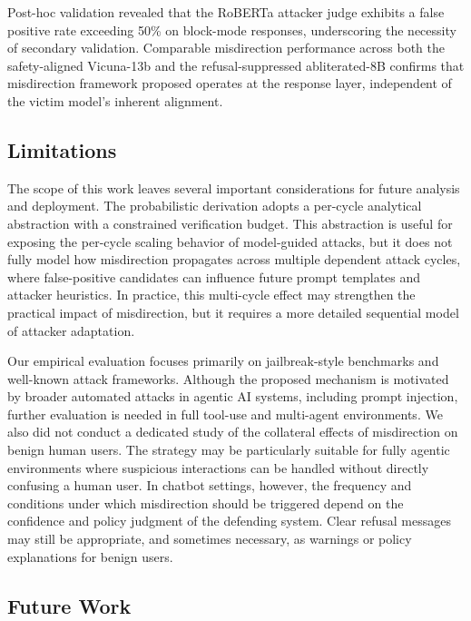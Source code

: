 \documentclass[conference,compsoc]{IEEEtran}
\begin{document}
Post-hoc validation revealed that the RoBERTa attacker judge exhibits a false positive rate exceeding 50\% on block-mode responses, underscoring the necessity of secondary validation. Comparable misdirection performance across both the safety-aligned Vicuna-13b and the refusal-suppressed abliterated-8B confirms that misdirection framework proposed operates at the response layer, independent of the victim model's inherent alignment.


\subsection{Limitations}
\label{sec:limitations}

The scope of this work leaves several important considerations for future analysis and deployment.
The probabilistic derivation adopts a per-cycle analytical abstraction with a constrained verification budget.
This abstraction is useful for exposing the per-cycle scaling behavior of model-guided attacks, but it does not fully model how misdirection propagates across multiple dependent attack cycles, where false-positive candidates can influence future prompt templates and attacker heuristics.
In practice, this multi-cycle effect may strengthen the practical impact of misdirection, but it requires a more detailed sequential model of attacker adaptation.

Our empirical evaluation focuses primarily on jailbreak-style benchmarks and well-known attack frameworks.
Although the proposed mechanism is motivated by broader automated attacks in agentic AI systems, including prompt injection, further evaluation is needed in full tool-use and multi-agent environments.
We also did not conduct a dedicated study of the collateral effects of misdirection on benign human users.
The strategy may be particularly suitable for fully agentic environments where suspicious interactions can be handled without directly confusing a human user.
In chatbot settings, however, the frequency and conditions under which misdirection should be triggered depend on the confidence and policy judgment of the defending system.
Clear refusal messages may still be appropriate, and sometimes necessary, as warnings or policy explanations for benign users.


\subsection{Future Work}
\label{sec:future-work}
\end{document}
